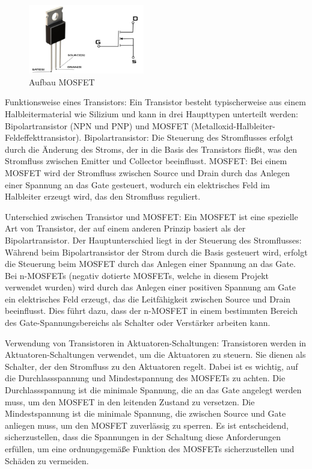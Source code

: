 \begin{figure}[htbp]
	\centering
	\includegraphics[width=0.45\textwidth]{img/Mosfet}
	\caption{Aufbau MOSFET}
	\label{img:transistor}
\end{figure}

Funktionsweise eines Transistors:
Ein Transistor besteht typischerweise aus einem Halbleitermaterial wie Silizium und kann in drei Haupttypen unterteilt
werden: Bipolartransistor (NPN und PNP) und MOSFET (Metalloxid-Halbleiter-Feldeffekttransistor).  \newline
Bipolartransistor: Die Steuerung des Stromflusses erfolgt durch die Änderung des Stroms, der in die Basis des
Transistors fließt, was den Stromfluss zwischen Emitter und Collector beeinflusst. \newline
MOSFET: Bei einem MOSFET wird der Stromfluss zwischen Source und Drain durch das Anlegen einer Spannung an das Gate
gesteuert, wodurch ein elektrisches Feld im Halbleiter erzeugt wird, das den Stromfluss reguliert. \newline

Unterschied zwischen Transistor und MOSFET: \newline
Ein MOSFET ist eine spezielle Art von Transistor, der auf einem anderen Prinzip basiert als der Bipolartransistor. Der
Hauptunterschied liegt in der Steuerung des Stromflusses: Während beim Bipolartransistor der Strom durch die Basis
gesteuert wird, erfolgt die Steuerung beim MOSFET durch das Anlegen einer Spannung an das Gate.
Bei n-MOSFETs (negativ dotierte MOSFETs, welche in diesem Projekt verwendet wurden) wird durch das Anlegen einer
positiven Spannung am Gate ein
elektrisches Feld erzeugt, das die Leitfähigkeit zwischen Source und Drain beeinflusst. Dies führt dazu, dass der n-MOSFET
in einem bestimmten Bereich des Gate-Spannungsbereichs als Schalter oder Verstärker arbeiten kann. \newline

Verwendung von Transistoren in Aktuatoren-Schaltungen:
Transistoren werden in Aktuatoren-Schaltungen verwendet, um die Aktuatoren
zu steuern. Sie dienen als Schalter, der den Stromfluss zu den Aktuatoren regelt.
Dabei ist es wichtig, auf die Durchlassspannung und Mindestspannung des MOSFETs zu achten. Die Durchlassspannung ist die
minimale Spannung, die an das Gate angelegt werden muss, um den MOSFET in den leitenden Zustand zu versetzen. Die
Mindestspannung ist die minimale Spannung, die zwischen Source und Gate anliegen muss, um den MOSFET zuverlässig zu
sperren.
Es ist entscheidend, sicherzustellen, dass die Spannungen in der Schaltung diese Anforderungen erfüllen, um
eine ordnungsgemäße Funktion des MOSFETs sicherzustellen und Schäden zu vermeiden.

